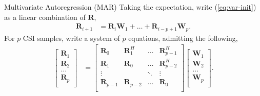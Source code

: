 \documentclass{beamer}
\begin{document}
  \begin{frame}{Multivariate Autoregression (MAR)}
    Taking the expectation, write (\ref{eq:var-init})
    as a linear combination of $\mathbf R$,
    \begin{align*}
    \mathbf R_{i+1} &= \mathbf{R}_{i} \mathbf W_{1} + \dots + \mathbf{R}_{i-p+1} \mathbf W_{p}. 
    \end{align*}
    For $p$ CSI samples, write a system of $p$
    equations, admitting the following,
    \begin{align*}
      \begin{bmatrix}
        \mathbf R_{1} \\ \mathbf R_{2} \\ \dots \\ \mathbf R_{p} \\
      \end{bmatrix}
      &= 
      \begin{bmatrix}
        \mathbf R_{0} & \mathbf R_1^H & \dots  & \mathbf R_{p-1}^H \\
        \mathbf R_{1} & \mathbf R_0   & \dots  & \mathbf R_{p-2}^H \\
        \vdots      &         & \ddots & \vdots \\
        \mathbf R_{p-1} & \mathbf R_{p-2}   & \dots  & \mathbf R_{0} \\
      \end{bmatrix}
      \begin{bmatrix}
        \mathbf W_{1} \\ \mathbf W_{2} \\ \dots \\ \mathbf W_{p} \\
      \end{bmatrix}.
    \end{align*}
  \end{frame}
\end{document}
